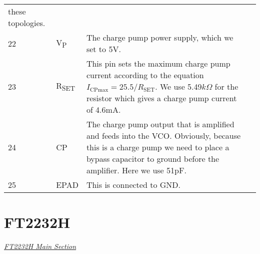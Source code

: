 \begin{tabularx}{\textwidth}{l l X>{\raggedright\arraybackslash}X}
        these topologies. \\
        22 & V\textsubscript{P} & The charge pump power supply, which we set to 5V. \\
        23 & R\textsubscript{SET} & This pin sets the maximum charge pump current according to the
        equation $I_{\text{CPmax}}=25.5/R_{\text{SET}}$. We use
        5.49$\si{k\Omega}$ for the resistor which gives a charge pump current
        of 4.6mA. \\
        24 & CP & The charge pump output that is amplified and feeds into the VCO. Obviously, because this
        is a charge pump we need to place a bypass capacitor to ground before the
        amplifier. Here we use 51pF. \\
        25 & EPAD & This is connected to GND. \\

        \bottomrule
\end{tabularx}

\section{FT2232H}
\label{sec:ft2232h-pinout}

\textit{\hyperref[sec:ft2232h]{FT2232H Main Section}}

